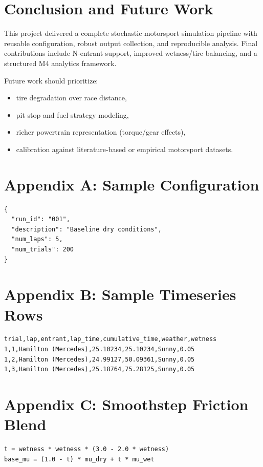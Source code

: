 \documentclass[12pt]{article}
\begin{document}
\section{Conclusion and Future Work}
This project delivered a complete stochastic motorsport simulation pipeline with reusable configuration, robust output collection, and reproducible analysis. Final contributions include N-entrant support, improved wetness/tire balancing, and a structured M4 analytics framework.

Future work should prioritize:
\begin{itemize}
    \item tire degradation over race distance,
    \item pit stop and fuel strategy modeling,
    \item richer powertrain representation (torque/gear effects),
    \item calibration against literature-based or empirical motorsport datasets.
\end{itemize}

\printbibliography[heading=bibintoc,title={References}]

\appendix
\section{Appendix A: Sample Configuration}
\begin{verbatim}
{
  "run_id": "001",
  "description": "Baseline dry conditions",
  "num_laps": 5,
  "num_trials": 200
}
\end{verbatim}

\section{Appendix B: Sample Timeseries Rows}
\begin{verbatim}
trial,lap,entrant,lap_time,cumulative_time,weather,wetness
1,1,Hamilton (Mercedes),25.10234,25.10234,Sunny,0.05
1,2,Hamilton (Mercedes),24.99127,50.09361,Sunny,0.05
1,3,Hamilton (Mercedes),25.18764,75.28125,Sunny,0.05
\end{verbatim}

\section{Appendix C: Smoothstep Friction Blend}
\begin{verbatim}
t = wetness * wetness * (3.0 - 2.0 * wetness)
base_mu = (1.0 - t) * mu_dry + t * mu_wet
\end{verbatim}
\end{document}
